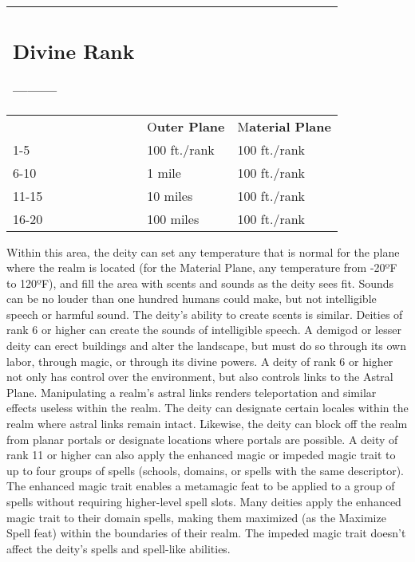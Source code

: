 \documentclass{article}
\begin{document}
\vspace{12pt}
\begin{tabular}{|>{\raggedright}p{52pt}|>{\raggedright}p{57pt}|>{\raggedright}p{70pt}|}
\hline
\subsection*{D\textbf{ivine Rank}}--------- & \multicolumn{2}{p{128pt}|}{\subsection*{ 
\textbf{Radius of Control ---------}}}\tabularnewline
\hline
  & O\textbf{uter Plane } & M\textbf{aterial Plane}\tabularnewline
\hline
1-5  & 100 ft./rank  & 100 ft./rank\tabularnewline
\hline
6-10  & 1 mile  & 100 ft./rank\tabularnewline
\hline
11-15  & 10 miles  & 100 ft./rank\tabularnewline
\hline
16-20  & 100 miles & 100 ft./rank\tabularnewline
\hline
\end{tabular}

\vspace{12pt}
Within this area, the deity can set any temperature that is normal for the plane 
where the realm is located (for the Material Plane, any temperature from -20ºF 
to 120ºF), and fill the area with scents and sounds as the deity sees fit. Sounds 
can be no louder than one hundred humans could make, but not intelligible speech 
or harmful sound. The deity's ability to create scents is similar. Deities of rank 
6 or higher can create the sounds of intelligible speech. A demigod or lesser deity 
can erect buildings and alter the landscape, but must do so through its own labor, 
through magic, or through its divine powers. A deity of rank 6 or higher not only 
has control over the environment, but also controls links to the Astral Plane. 
Manipulating a realm's astral links renders teleportation and similar effects useless 
within the realm. The deity can designate certain locales within the realm where 
astral links remain intact. Likewise, the deity can block off the realm from planar 
portals or designate locations where portals are possible. A deity of rank 11 or 
higher can also apply the enhanced magic or impeded magic trait to up to four groups 
of spells (schools, domains, or spells with the same descriptor). The enhanced 
magic trait enables a metamagic feat to be applied to a group of spells without 
requiring higher-level spell slots. Many deities apply the enhanced magic trait 
to their domain spells, making them maximized (as the Maximize Spell feat) within 
the boundaries of their realm. The impeded magic trait doesn't affect the deity's 
spells and spell-like abilities.
\end{document}
